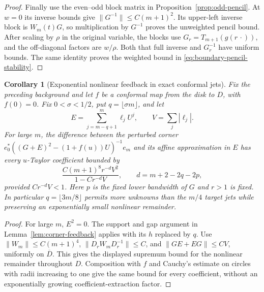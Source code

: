 \documentclass[11pt]{article}
\newtheorem{corollary}[proposition]{Corollary}
\begin{document}
\begin{proof}
Finally use the even--odd block matrix in
Proposition~\ref{prop:odd-pencil}. At $w=0$ its inverse bounds give
$\|G^{-1}\|\le C(m+1)^2$. Its upper-left inverse block is $W_m(t)G$,
so multiplication by $G^{-1}$ proves the unweighted pencil bound.
After scaling by $\rho$ in the original variable, the blocks use
$G_r=T_{m+1}(g(r\,\cdot))$, and the off-diagonal factors are
$w/\rho$. Both that full inverse and $G_r^{-1}$ have uniform bounds.
The same identity proves the weighted bound in
\eqref{eq:boundary-pencil-stability}.
\end{proof}


\begin{corollary}[Exponential nonlinear feedback in exact conformal jets]
\label{cor:conformal-feedback-bound}
Fix the preceding background and let $f$ be a conformal map from the
disk to $D$, with $f(0)=0$. Fix $0<\sigma<1/2$, put
$q=\lfloor\sigma m\rfloor$, and let
\[
 E=\sum_{j=m-q+1}^m\ell_jU^j,\qquad V=\sum_j|\ell_j|.
\]
For large $m$, the difference between the perturbed corner
$e_0^*((G+E)^2-(1+f(u))U)^{-1}e_m$ and its affine approximation in
$E$ has every $u$-Taylor coefficient bounded by
\[
 \frac{C(m+1)^8 r^{-d}V^2}{1-Cr^{-d}V},\qquad
 d=m+2-2q-2p,
\]
provided $Cr^{-d}V<1$. Here $p$ is the fixed lower bandwidth of $G$
and $r>1$ is fixed. In particular $q=\lfloor3m/8\rfloor$ permits
more unknowns than the $m/4$ target jets while preserving an
exponentially small nonlinear remainder.
\end{corollary}
\begin{proof}
For large $m$, $E^2=0$. The support and gap argument in
Lemma~\ref{lem:corner-feedback} applies with its $h$ replaced by $q$.
Use $\|W_m\|\le C(m+1)^4$, $\|D_rW_mD_r^{-1}\|\le C$, and
$\|GE+EG\|\le CV$, uniformly on $\overline D$.
This gives the displayed supremum bound for the nonlinear remainder
throughout $D$. Composition with $f$ and Cauchy's estimate on circles
with radii increasing to one give the same bound for every coefficient,
without an exponentially growing coefficient-extraction factor.
\end{proof}
\end{document}
